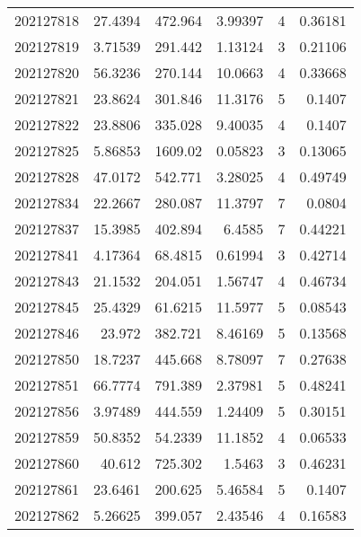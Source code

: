 \begin{tabular}{rrrrrr}
 202127818 &         27.4394  &      472.964  &            3.99397 &           4 & 0.36181 \\
 202127819 &          3.71539 &      291.442  &            1.13124 &           3 & 0.21106 \\
 202127820 &         56.3236  &      270.144  &           10.0663  &           4 & 0.33668 \\
 202127821 &         23.8624  &      301.846  &           11.3176  &           5 & 0.1407  \\
 202127822 &         23.8806  &      335.028  &            9.40035 &           4 & 0.1407  \\
 202127825 &          5.86853 &     1609.02   &            0.05823 &           3 & 0.13065 \\
 202127828 &         47.0172  &      542.771  &            3.28025 &           4 & 0.49749 \\
 202127834 &         22.2667  &      280.087  &           11.3797  &           7 & 0.0804  \\
 202127837 &         15.3985  &      402.894  &            6.4585  &           7 & 0.44221 \\
 202127841 &          4.17364 &       68.4815 &            0.61994 &           3 & 0.42714 \\
 202127843 &         21.1532  &      204.051  &            1.56747 &           4 & 0.46734 \\
 202127845 &         25.4329  &       61.6215 &           11.5977  &           5 & 0.08543 \\
 202127846 &         23.972   &      382.721  &            8.46169 &           5 & 0.13568 \\
 202127850 &         18.7237  &      445.668  &            8.78097 &           7 & 0.27638 \\
 202127851 &         66.7774  &      791.389  &            2.37981 &           5 & 0.48241 \\
 202127856 &          3.97489 &      444.559  &            1.24409 &           5 & 0.30151 \\
 202127859 &         50.8352  &       54.2339 &           11.1852  &           4 & 0.06533 \\
 202127860 &         40.612   &      725.302  &            1.5463  &           3 & 0.46231 \\
 202127861 &         23.6461  &      200.625  &            5.46584 &           5 & 0.1407  \\
 202127862 &          5.26625 &      399.057  &            2.43546 &           4 & 0.16583 \\

\end{tabular}
